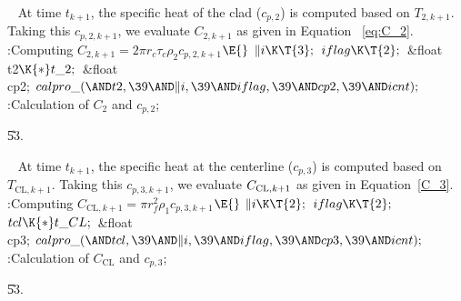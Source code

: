 \documentclass[letterpaper,12pt,baseclass=report]{cweb-hy}
\begin{document}
{
~\newline
At time $t_{k+1}$, the specific heat of the clad ($c_{p,2}$) is computed based
on $T_{2,k+1}$.
Taking this $c_{p,2,k+1}$, we evaluate $C_{2,k+1}$  as given in Equation~%
\ref{eq:C_2}.
\Y\B\4:Computing $C_{2,k+1} =2 \pi r_c \tau_c \rho_2 c_{p,2,k+1}$\X${}\E{}$%
\6
$\|i\K\T{3};{}$\6
${}\\{iflag}\K\T{2};{}$\7
\&{float} \\{t2}${}\K{*}\\{t\_2};{}$\6
\&{float} \\{cp2};\7
${}\\{calpro\_}({\AND}\\{t2},\39{\AND}\|i,\39{\AND}\\{iflag},\39{\AND}\\{cp2},%
\39{\AND}\\{icnt});{}$\6
:Calculation of $C_{2}$ and $c_{p,2}$\X;\par
\U53.\fi

~\newline
At time $t_{k+1}$, the specific heat at the centerline ($c_{p,3}$) is computed
based
on $T_{\mathrm{CL},k+1}$. Taking this $c_{p,3,k+1}$, we evaluate $C_{%
\mathrm{CL},k+1}$
as given in Equation~\ref{C_3}.
\Y\B\4:Computing $C_{\text{CL},k+1} = \pi r_f ^2 \rho_ 1 c_{p,3,k+1}$\X${}%
\E{}$\6
$\|i\K\T{2};{}$\6
${}\\{iflag}\K\T{2};{}$\6
${}\\{tcl}\K{*}\\{t\_CL};{}$\7
\&{float} \\{cp3};\7
${}\\{calpro\_}({\AND}\\{tcl},\39{\AND}\|i,\39{\AND}\\{iflag},\39{\AND}\\{cp3},%
\39{\AND}\\{icnt});{}$\6
:Calculation of $C_{\text{CL}}$ and $c_{p,3}$\X;\par
\U53.\fi

\fi

}
\end{document}
